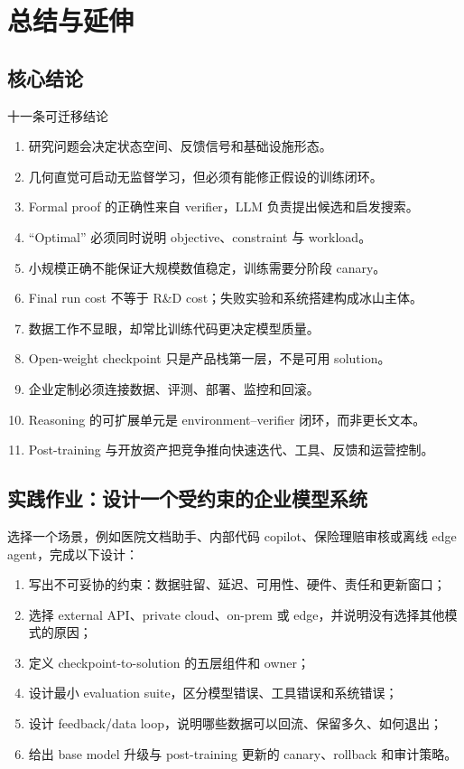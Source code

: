 \section{总结与延伸}

\subsection{核心结论}

\begin{importantbox}{十一条可迁移结论}
\begin{enumerate}
  \item 研究问题会决定状态空间、反馈信号和基础设施形态。
  \item 几何直觉可启动无监督学习，但必须有能修正假设的训练闭环。
  \item Formal proof 的正确性来自 verifier，LLM 负责提出候选和启发搜索。
  \item “Optimal” 必须同时说明 objective、constraint 与 workload。
  \item 小规模正确不能保证大规模数值稳定，训练需要分阶段 canary。
  \item Final run cost 不等于 R\&D cost；失败实验和系统搭建构成冰山主体。
  \item 数据工作不显眼，却常比训练代码更决定模型质量。
  \item Open-weight checkpoint 只是产品栈第一层，不是可用 solution。
  \item 企业定制必须连接数据、评测、部署、监控和回滚。
  \item Reasoning 的可扩展单元是 environment--verifier 闭环，而非更长文本。
  \item Post-training 与开放资产把竞争推向快速迭代、工具、反馈和运营控制。
\end{enumerate}
\end{importantbox}

\subsection{实践作业：设计一个受约束的企业模型系统}

选择一个场景，例如医院文档助手、内部代码 copilot、保险理赔审核或离线 edge agent，完成以下设计：

\begin{enumerate}
  \item 写出不可妥协的约束：数据驻留、延迟、可用性、硬件、责任和更新窗口；
  \item 选择 external API、private cloud、on-prem 或 edge，并说明没有选择其他模式的原因；
  \item 定义 checkpoint-to-solution 的五层组件和 owner；
  \item 设计最小 evaluation suite，区分模型错误、工具错误和系统错误；
  \item 设计 feedback/data loop，说明哪些数据可以回流、保留多久、如何退出；
  \item 给出 base model 升级与 post-training 更新的 canary、rollback 和审计策略。
\end{enumerate}

